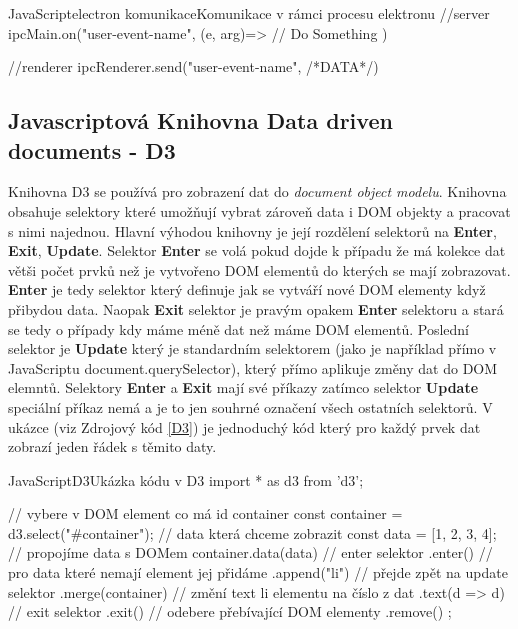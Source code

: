 \documentclass[
  biblatex,
  glossaries,
  index
]{kidiplom}
\begin{document}

\begin{kicode}{JavaScript}{electron komunikace}{Komunikace v rámci procesu elektronu}
  //server
  ipcMain.on("user-event-name", (e, arg)=>{
    // Do Something
  })

  //renderer
  ipcRenderer.send("user-event-name", {/*DATA*/})
\end{kicode}

\subsection{Javascriptová Knihovna Data driven documents - D3}
Knihovna D3 se používá pro zobrazení dat do 
\textit{document object modelu}.
Knihovna obsahuje selektory které umožňují vybrat zároveň data 
i DOM objekty a pracovat s nimi najednou. Hlavní výhodou knihovny 
je její rozdělení selektorů na \textbf{Enter}, \textbf{Exit}, \textbf{Update}.
Selektor \textbf{Enter} se volá pokud dojde k případu že má kolekce 
dat větši počet prvků než je vytvořeno DOM elementů do kterých se mají zobrazovat.
\textbf{Enter} je tedy selektor který definuje jak se vytváří nové DOM elementy 
když přibydou data. Naopak \textbf{Exit} selektor je pravým opakem \textbf{Enter}
selektoru a stará se tedy o případy kdy máme méně dat než máme DOM elementů.
Poslední selektor je \textbf{Update} který je standardním selektorem 
(jako je například přímo v JavaScriptu document.querySelector), který přímo 
aplikuje změny dat do DOM elemntů. Selektory \textbf{Enter} a \textbf{Exit} 
mají své příkazy zatímco selektor \textbf{Update} speciální příkaz nemá a je to jen 
souhrné označení všech ostatních selektorů. V ukázce (viz Zdrojový kód \ref{D3}) je
jednoduchý kód který pro každý prvek dat zobrazí jeden řádek s těmito daty.

\begin{kicode}{JavaScript}{D3}{Ukázka kódu v D3}
import * as d3 from 'd3';

// vybere v DOM element co má id container
const container = d3.select("#container");
// data která chceme zobrazit 
const data = [1, 2, 3, 4];
// propojíme data s DOMem
container.data(data)
    // enter selektor
    .enter()
    // pro data které nemají element jej přidáme
    .append("li")
    // přejde zpět na update selektor
    .merge(container)
    // změní text li elementu na číslo z dat
    .text(d => d)
    // exit selektor
    .exit()
    // odebere přebívající DOM elementy
    .remove()
    ;
  
\end{kicode}
\end{document}
